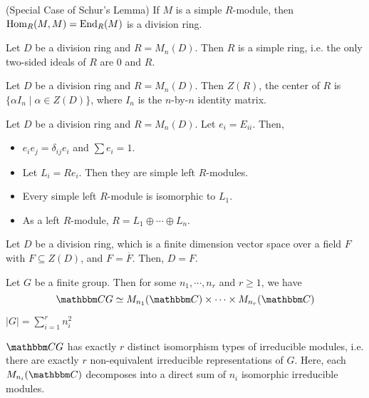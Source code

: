 \documentclass{article}
\begin{document}
\begin{corollary}(Special Case of Schur's Lemma)
  If \(M\) is a simple \(R\)-module,
  then \(\textnormal{Hom}_R(M, M) = \textnormal{End}_R(M)\) is a division ring.
\end{corollary}

\begin{theorem}
  Let \(D\) be a division ring and \(R = M_n(D)\).
  Then \(R\) is a simple ring,
  i.e. the only two-sided ideals of \(R\) are 0 and \(R\).
\end{theorem}

\begin{theorem}
  Let \(D\) be a division ring and \(R = M_n(D)\).
  Then \(Z(R)\), the center of \(R\)
  is \(\{\alpha I_n \mid \alpha \in Z(D)\}\),
  where \(I_n\) is the \(n\)-by-\(n\) identity matrix.
\end{theorem}

\begin{theorem}
  Let \(D\) be a division ring and \(R = M_n(D)\).
  Let \(e_i = E_{ii}\).
  Then,
  \begin{itemize}
  \item \(e_i e_j = \delta_{ij} e_i\) and \(\sum e_i = 1\).
  \item Let \(L_i = Re_i\). Then they are simple left \(R\)-modules.
  \item Every simple left \(R\)-module is isomorphic to \(L_1\).
  \item As a left \(R\)-module, \(R = L_1 \oplus \cdots \oplus L_n\).
  \end{itemize}
\end{theorem}

\begin{theorem}
  Let \(D\) be a division ring,
  which is a finite dimension vector space over a field \(F\) with \(F \subseteq Z(D)\),
  and \(F = \overline{F}\).
  Then, \(D = F\).
\end{theorem}

\begin{theorem}
  Let \(G\) be a finite group.
  Then for some \(n_1, \cdots, n_r\) and \(r \ge 1\),
  we have
  \[\bbC G \simeq M_{n_1}(\bbC) \times \cdots \times M_{n_r}(\bbC)\]
\end{theorem}

\begin{corollary}
  \(|G| = \sum_{i=1}^r n_i^2\)
\end{corollary}

\begin{theorem}
  \(\bbC G\) has exactly \(r\) distinct isomorphism types of irreducible modules,
  i.e. there are exactly \(r\) non-equivalent irreducible representations
  of \(G\).
  Here, each \(M_{n_i}(\bbC)\) decomposes into a direct sum of
  \(n_i\) isomorphic irreducible modules.
\end{theorem}
\end{document}

